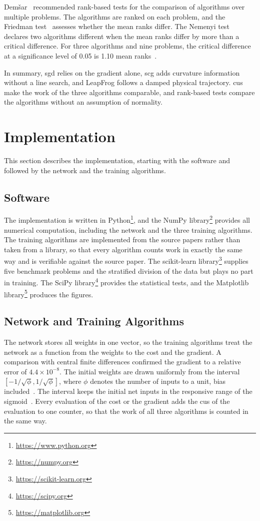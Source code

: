 \documentclass[conference]{IEEEtran}
\begin{document}
Dem\v{s}ar~\cite{demsar2006} recommended rank-based tests for the comparison of
algorithms over multiple problems. The algorithms are ranked on each problem, and the Friedman
test~\cite{friedman1937} assesses whether the mean ranks differ.
The Nemenyi test~\cite{demsar2006,nemenyi1963} declares two algorithms different when the mean
ranks differ by more than a critical difference. For three algorithms and nine
problems, the critical difference at a significance level of 0.05 is 1.10 mean
ranks~\cite{demsar2006}.

In summary, \gls{sgd} relies on the gradient alone, \gls{scg} adds curvature
information without a line search, and LeapFrog follows a damped physical
trajectory. \Glspl{cu} make the work of the three algorithms comparable, and
rank-based tests compare the algorithms without an assumption of normality.

\section{Implementation}

This section describes the implementation, starting with the software and
followed by the network and the training algorithms.

\subsection{Software}

The implementation is written in Python\footnote{\url{https://www.python.org}},
and the NumPy library\footnote{\url{https://numpy.org}} provides all numerical
computation,
including the network and the three training algorithms. The training algorithms
are implemented from the source papers rather than taken from a library, so that
every algorithm counts work in exactly the same way and is verifiable against the
source paper. The scikit-learn
library\footnote{\url{https://scikit-learn.org}} supplies five benchmark problems
and the stratified division of the data but plays no part in training. The SciPy
library\footnote{\url{https://scipy.org}} provides the statistical tests, and the
Matplotlib library\footnote{\url{https://matplotlib.org}} produces the figures.

\subsection{Network and Training Algorithms}

The network stores all weights in one vector, so the training algorithms treat
the network as a function from the weights to the cost and the gradient. A
comparison with central finite differences confirmed the gradient to a relative
error of $4.4 \times 10^{-8}$. The initial weights are drawn uniformly from the
interval $[-1/\sqrt{\phi}, 1/\sqrt{\phi}]$, where $\phi$ denotes the number of
inputs to a unit, bias included~\cite{engelbrecht2007}. The interval keeps the initial net inputs in the
responsive range of the sigmoid~\cite{lecun1998}. Every evaluation of the cost or
the gradient adds the \glspl{cu} of the evaluation to one counter, so that the
work of all three algorithms is counted in the same way.
\end{document}
